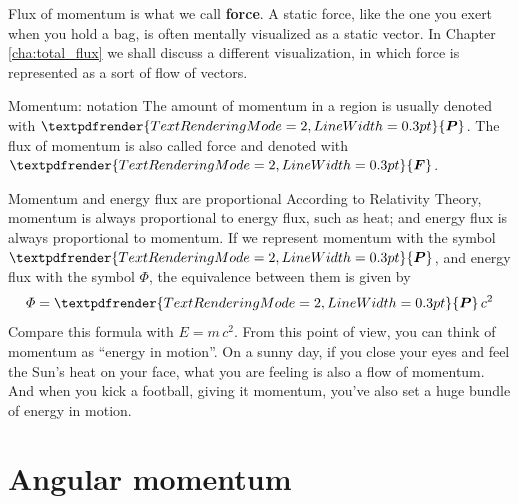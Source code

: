 \documentclass[a4paper,12pt,%
onecolumn,oneside,%
british%
]{memoir}
\renewcommand*{\bm}[1]{\textpdfrender{TextRenderingMode=2,LineWidth=0.3pt}{\boldsymbol{#1}}}
\newcommand{\mynotew}[1]{{\footnotesize\color{midgrey}\faIcon{tools}\ #1}}
\renewcommand*{\|}[1][]{\nonscript\:#1\vert\nonscript\:\mathopen{}}
\newcommand*{\sect}{\S}%
\newcommand*{\chap}{Chapter}%
\newcommand*{\masse}{mass-energy}
\newcommand*{\yc}{c} %
\newcommand*{\yM}{m}%
\newcommand*{\yE}{E}
\newcommand*{\yH}{\varPhi}%
\newcommand*{\yP}{\bm{P}}
\newcommand*{\yF}{\bm{F}}
\begin{document}
\medskip

Flux of momentum is what we call \textbf{force}. A static force, like the one you exert when you hold a bag, is often mentally visualized as a static vector. In \chap\,\ref{cha:total_flux} we shall discuss a different visualization, in which force is represented as a sort of flow of vectors.



\begin{definition}{Momentum: notation}
  The amount of momentum in a region is usually denoted with $\yP$. The flux of momentum is also called force and denoted with $\yF$.
\end{definition}



\begin{extra}{Momentum and energy flux are proportional}
  According to Relativity Theory, momentum is always proportional to energy flux, such as heat; and energy flux is always proportional to momentum. If we represent momentum with the symbol $\yP$, and energy flux with the symbol $\yH$, the equivalence between them is given by
  \begin{equation}
    \label{eq:momentum_heat}
    \yH = \yP\,\yc^{2}
  \end{equation}
  Compare this formula with $\yE=\yM\,\yc^{2}$. From this point of view, you can think of momentum as \enquote{energy in motion}. %
  On a sunny day, if you close your eyes and feel the Sun's heat on your face, what you are feeling is also a flow of momentum. And when you kick a football, giving it momentum, you've also set a huge bundle of energy in motion.
\end{extra}



\section{Angular momentum}
\label{sec:intro_angmomentum}
\end{document}
